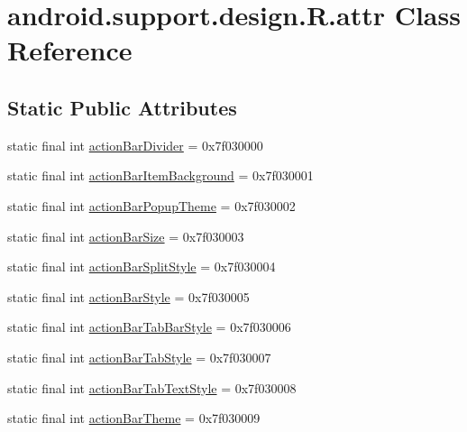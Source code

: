 \hypertarget{classandroid_1_1support_1_1design_1_1_r_1_1attr}{}\section{android.\+support.\+design.\+R.\+attr Class Reference}
\label{classandroid_1_1support_1_1design_1_1_r_1_1attr}
\subsection*{Static Public Attributes}
\begin{DoxyCompactItemize}
\item 
static final int \mbox{\hyperlink{classandroid_1_1support_1_1design_1_1_r_1_1attr_ae760bb3759dc75e0a49d12b13a525863}{action\+Bar\+Divider}} = 0x7f030000
\item 
static final int \mbox{\hyperlink{classandroid_1_1support_1_1design_1_1_r_1_1attr_a22428b19c7a60481d738d41421d2cae0}{action\+Bar\+Item\+Background}} = 0x7f030001
\item 
static final int \mbox{\hyperlink{classandroid_1_1support_1_1design_1_1_r_1_1attr_a3099f3c0b99e3397da50683e55b24099}{action\+Bar\+Popup\+Theme}} = 0x7f030002
\item 
static final int \mbox{\hyperlink{classandroid_1_1support_1_1design_1_1_r_1_1attr_a3b80a59651b1b38d6c5497c22058009a}{action\+Bar\+Size}} = 0x7f030003
\item 
static final int \mbox{\hyperlink{classandroid_1_1support_1_1design_1_1_r_1_1attr_af3f9f00064ed4da503a855889da464de}{action\+Bar\+Split\+Style}} = 0x7f030004
\item 
static final int \mbox{\hyperlink{classandroid_1_1support_1_1design_1_1_r_1_1attr_afe4ac373c79d64575d48146ce16087f2}{action\+Bar\+Style}} = 0x7f030005
\item 
static final int \mbox{\hyperlink{classandroid_1_1support_1_1design_1_1_r_1_1attr_a2ca82a9598dc456d84aabd95ed349dc2}{action\+Bar\+Tab\+Bar\+Style}} = 0x7f030006
\item 
static final int \mbox{\hyperlink{classandroid_1_1support_1_1design_1_1_r_1_1attr_a52b2ed4142fd2acadf605ff733a7443b}{action\+Bar\+Tab\+Style}} = 0x7f030007
\item 
static final int \mbox{\hyperlink{classandroid_1_1support_1_1design_1_1_r_1_1attr_ab794448e6906906fc9edb74109c3ad5e}{action\+Bar\+Tab\+Text\+Style}} = 0x7f030008
\item 
static final int \mbox{\hyperlink{classandroid_1_1support_1_1design_1_1_r_1_1attr_a92eaedad4431dca9ec3d00edd8434ce2}{action\+Bar\+Theme}} = 0x7f030009

\end{DoxyCompactItemize}
